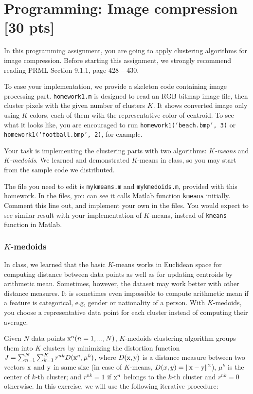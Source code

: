 \documentclass[twoside,10pt]{article}
\begin{document}
\section{Programming: Image compression [30 pts]}

In this programming assignment, you are going to apply clustering algorithms for image compression. Before starting this assignment, we strongly recommend reading PRML Section 9.1.1, page 428 -- 430.

To ease your implementation, we provide a skeleton code containing image processing part. \texttt{homework1.m} is designed to read an RGB bitmap image file, then cluster pixels with the given number of clusters $K$. It shows converted image only using $K$ colors, each of them with the representative color of centroid. To see what it looks like, you are encouraged to run \texttt{homework1(`beach.bmp', 3)} or \texttt{homework1(`football.bmp', 2)}, for example.

Your task is implementing the clustering parts with two algorithms: \emph{$K$-means} and \emph{$K$-medoids}. We learned and demonstrated $K$-means in class, so you may start from the sample code we distributed.

The file you need to edit is \texttt{mykmeans.m} and \texttt{mykmedoids.m}, provided with this homework. In the files, you can see it calls Matlab function \texttt{kmeans} initially. Comment this line out, and implement your own in the files. You would expect to see similar result with your implementation of $K$-means, instead of \texttt{kmeans} function in Matlab.

\subsubsection*{$K$-medoids}

In class, we learned that the basic $K$-means works in Euclidean space for computing distance between data points as well as for updating centroids by arithmetic mean. Sometimes, however, the dataset may work better with other distance measures. It is sometimes even impossible to compute arithmetic mean if a feature is categorical, e.g, gender or nationality of a person. With $K$-medoids, you choose a representative data point for each cluster instead of computing their average.

Given $N$ data points $\text x^n (n = 1, ..., N)$, $K$-medoids clustering algorithm groups them into $K$ clusters by minimizing the distortion function $J = \sum_{n=1}^N \sum_{k=1}^K r^{nk} D(\text x^n, \mu^k)$,
where $D(\text x, \text y)$ is a distance measure between two vectors $\text x$ and $\text y$ in same size (in case of $K$-means, $D(x, y) = \| \text x - \text y \|^2$), $\mu^k$ is the center of $k$-th cluster; and $r^{nk} = 1$ if $\text x^n$ belongs to the $k$-th cluster and $r^{nk} = 0$ otherwise. In this exercise, we will use the following iterative procedure:
\end{document}
